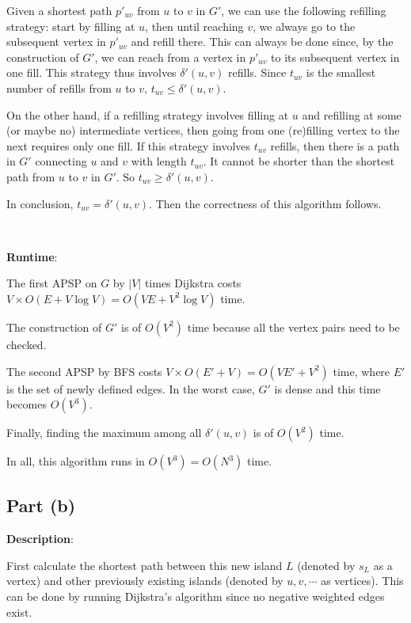 \documentclass{article}
\begin{document}
Given a shortest path $p'_{uv}$ from $u$ to $v$ in $G'$, we can use the following refilling strategy: start by filling at $u$, then until reaching $v$, we always go to the subsequent vertex in $p'_{uv}$ and refill there. This can always be done since, by the construction of $G'$, we can reach from a vertex in $p'_{uv}$ to its subsequent vertex in one fill. This strategy thus involves $\delta'(u,v)$ refills. Since $t_{uv}$ is the smallest number of refills from $u$ to $v$, $t_{uv}\leqslant\delta'(u,v)$.

On the other hand, if a refilling strategy involves filling at $u$ and refilling at some (or maybe no) intermediate vertices, then going from one (re)filling vertex to the next requires only one fill. If this strategy involves $t_{uv}$ refills, then there is a path in $G'$ connecting $u$ and $v$ with length $t_{uv}$. It cannot be shorter than the shortest path from $u$ to $v$ in $G'$. So $t_{uv}\geqslant\delta'(u,v)$.

In conclusion, $t_{uv}=\delta'(u,v)$. Then the correctness of this algorithm follows.

~

\noindent\textbf{Runtime}:

The first APSP on $G$ by $|V|$ times Dijkstra costs $V\times O(E+V\log V)=O(VE+V^2\log V)$ time.

The construction of $G'$ is of $O(V^2)$ time because all the vertex pairs need to be checked.

The second APSP by BFS costs $V\times O(E'+V)=O(VE'+V^2)$ time, where $E'$ is the set of newly defined edges. In the worst case, $G'$ is dense and this time becomes $O(V^3)$.

Finally, finding the maximum among all $\delta'(u,v)$ is of $O(V^2)$ time.

In all, this algorithm runs in $O(V^3)=O(N^3)$ time.

\subsection{Part (b)}
\noindent\textbf{Description}:

First calculate the shortest path between this new island $L$ (denoted by $s_L$ as a vertex) and other previously existing islands (denoted by $u,v,\cdots$ as vertices). %
This can be done by running Dijkstra's algorithm since no negative weighted edges exist.
\end{document}
